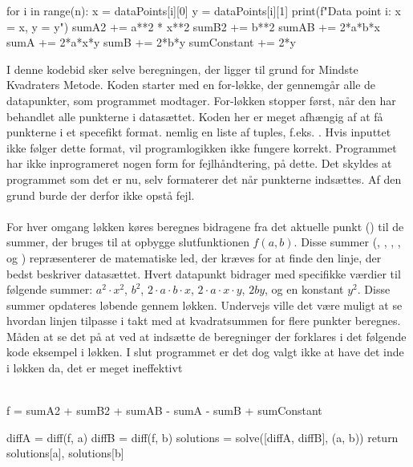\begin{python}
    for i in range(n): 
        x = dataPoints[i][0] 
        y = dataPoints[i][1] 
        print(f"Data point {i}: x = {x}, y = {y}") 
        sumA2 += a**2 * x**2 
        sumB2 += b**2      
        sumAB += 2*a*b*x   
        sumA += 2*a*x*y   
        sumB += 2*b*y    
        sumConstant += 2*y 
\end{python}
I denne kodebid sker selve beregningen, der ligger til grund for Mindste Kvadraters Metode. Koden starter med en for-løkke, der gennemgår alle de datapunkter, som programmet modtager. For-løkken stopper først, når den har behandlet alle punkterne i datasættet. Koden her er meget afhængig af at få punkterne i et specefikt format. nemlig en liste af tuples, f.eks. \pythoninline{[(x_1, y_1), (x_2, y_2)]}. Hvis inputtet ikke følger dette format, vil programlogikken ikke fungere korrekt. Programmet har ikke inprogrameret nogen form for fejlhåndtering, på dette. Det skyldes at programmet som det er nu, selv formaterer det når punkterne indsættes. Af den grund burde der derfor ikke opstå fejl. \\\\
For hver omgang løkken køres beregnes bidragene fra det aktuelle punkt () til de summer, der bruges til at opbygge slutfunktionen $f(a,b)$. Disse summer (, , , ,  og ) repræsenterer de matematiske led, der kræves for at finde den linje, der bedst beskriver datasættet. Hvert datapunkt bidrager med specifikke værdier til følgende summer: $a^2 \cdot x^2$, $b^2$, $2 \cdot a \cdot b \cdot x$, $2 \cdot a \cdot x \cdot y$, $2by$, og en konstant $y^2$. Disse summer opdateres løbende gennem løkken. Undervejs ville det være muligt at se hvordan linjen tilpasse i takt med at kvadratsummen for flere punkter beregnes. Måden at se det på at ved at indsætte de beregninger der forklares i det følgende kode eksempel i løkken. I slut programmet er det dog valgt ikke at have det inde i løkken da, det er meget ineffektivt   \\\\
\begin{python}
    f = sumA2 + sumB2 + sumAB - sumA - sumB + sumConstant 

    diffA = diff(f, a) 
    diffB = diff(f, b) 
    solutions = solve([diffA, diffB], (a, b)) 
    return solutions[a], solutions[b] 
\end{python}
